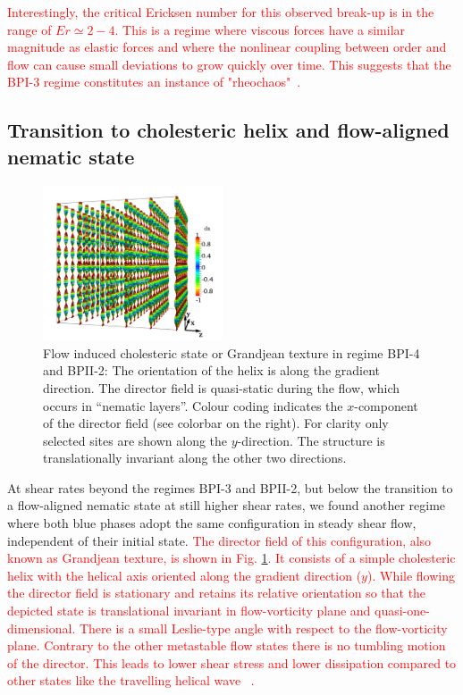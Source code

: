 \documentclass[8.5pt,twoside,twocolumn]{article}
\newcommand{\rev}[1]{{\textcolor{red}{#1}}}
\begin{document}
\rev{
Interestingly, the critical Ericksen number for this observed break-up is in 
the range of $Er\simeq 2-4$. This is a regime where viscous forces have a 
similar magnitude as elastic forces and where the nonlinear coupling between
order and flow can cause small deviations to grow quickly over time. 
This suggests that the BPI-3 regime constitutes an instance 
of "rheochaos"~\cite{rheochaos,Cates:2002}.
}

\subsection{Transition to cholesteric helix and flow-aligned nematic state}\label{gj-fan}

\begin{figure}[htpb]
\includegraphics[width=0.475\textwidth]{dir3d+y-200k_run1179r.png}
\caption{Flow induced cholesteric state or Grandjean texture in regime BPI-4 and BPII-2: 
The orientation of the helix is along the gradient direction. 
The director field is quasi-static during the flow, which occurs 
in ``nematic layers''. Colour coding indicates the 
$x$-component of the director field (see colorbar on the right).
For clarity only selected sites are shown along the $y$-direction.
The structure is translationally invariant along the other two directions.}
\label{grandjean}
\end{figure}

At shear rates beyond the regimes BPI-3 and BPII-2, but below the transition to a 
flow-aligned nematic state at still higher shear rates, we found another regime where 
both blue phases adopt the same configuration in steady shear flow, 
independent of their initial state.
\rev{
The director field of this configuration, also known as
Grandjean texture, is shown in Fig. \ref{grandjean}.
It consists of a simple cholesteric helix with the helical axis oriented 
along the gradient direction ($y$). While flowing the director field is stationary and 
retains its relative orientation so that the depicted state is translational invariant 
in flow-vorticity plane and quasi-one-dimensional. 
There is a small Leslie-type angle with respect to 
the flow-vorticity plane. 
Contrary to the other metastable flow states there is no tumbling motion 
of the director. This leads to lower shear stress and lower dissipation 
compared to other states like the travelling helical wave ~\cite{Rey:1996a, Rey:1996b}.
} 
\end{document}
